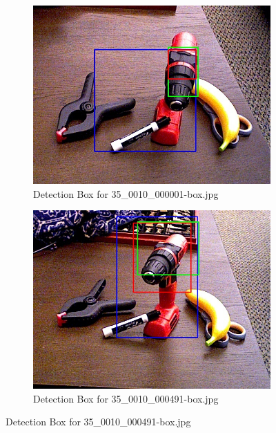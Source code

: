 \documentclass[10.5pt,a4paper]{article}
\begin{document}
\begin{figure}
    \vspace{2em}

    \begin{subfigure}{0.45\textwidth}
        \centering
        \includegraphics[width=\textwidth]{img/35_0010_000001-box.jpg}
        \caption{Detection Box for 35\_0010\_000001-box.jpg}
        \label{fig:img21}
    \end{subfigure}
    \hfill
    \begin{subfigure}{0.45\textwidth}
        \centering
        \includegraphics[width=\textwidth]{img/35_0010_000491-box.jpg}
        \caption{Detection Box for 35\_0010\_000491-box.jpg}
        \label{fig:img22}
    \end{subfigure}


\end{figure}
\end{document}
